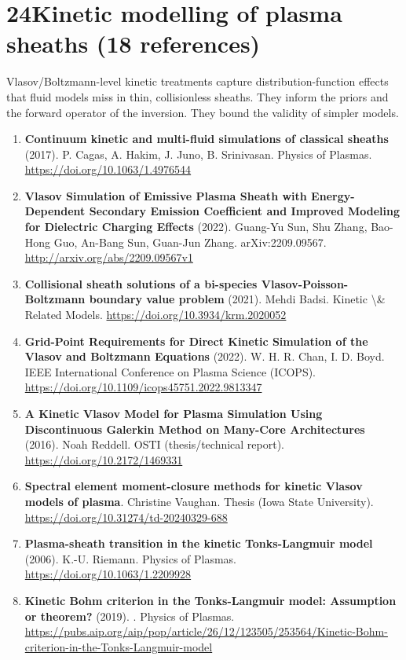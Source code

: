 \documentclass[11pt,a4paper]{article}
\begin{document}
\section*{24\quad Kinetic modelling of plasma sheaths \textnormal{(\normalsize 18 references)}}
Vlasov/Boltzmann-level kinetic treatments capture distribution-function effects that fluid models miss in thin, collisionless sheaths. They inform the priors and the forward operator of the inversion. They bound the validity of simpler models.
\begin{enumerate}[leftmargin=1.4em]
\item \textbf{Continuum kinetic and multi-fluid simulations of classical sheaths} (2017). P. Cagas, A. Hakim, J. Juno, B. Srinivasan. Physics of Plasmas. \url{https://doi.org/10.1063/1.4976544}
\item \textbf{Vlasov Simulation of Emissive Plasma Sheath with Energy-Dependent Secondary Emission Coefficient and Improved Modeling for Dielectric Charging Effects} (2022). Guang-Yu Sun, Shu Zhang, Bao-Hong Guo, An-Bang Sun, Guan-Jun Zhang. arXiv:2209.09567. \url{http://arxiv.org/abs/2209.09567v1}
\item \textbf{Collisional sheath solutions of a bi-species Vlasov-Poisson-Boltzmann boundary value problem} (2021). Mehdi Badsi. Kinetic \textbackslash{}\& Related Models. \url{https://doi.org/10.3934/krm.2020052}
\item \textbf{Grid-Point Requirements for Direct Kinetic Simulation of the Vlasov and Boltzmann Equations} (2022). W. H. R. Chan, I. D. Boyd. IEEE International Conference on Plasma Science (ICOPS). \url{https://doi.org/10.1109/icops45751.2022.9813347}
\item \textbf{A Kinetic Vlasov Model for Plasma Simulation Using Discontinuous Galerkin Method on Many-Core Architectures} (2016). Noah Reddell. OSTI (thesis/technical report). \url{https://doi.org/10.2172/1469331}
\item \textbf{Spectral element moment-closure methods for kinetic Vlasov models of plasma}. Christine Vaughan. Thesis (Iowa State University). \url{https://doi.org/10.31274/td-20240329-688}
\item \textbf{Plasma-sheath transition in the kinetic Tonks-Langmuir model} (2006). K.-U. Riemann. Physics of Plasmas. \url{https://doi.org/10.1063/1.2209928}
\item \textbf{Kinetic Bohm criterion in the Tonks-Langmuir model: Assumption or theorem?} (2019). . Physics of Plasmas. \url{https://pubs.aip.org/aip/pop/article/26/12/123505/253564/Kinetic-Bohm-criterion-in-the-Tonks-Langmuir-model}

\end{enumerate}
\end{document}
